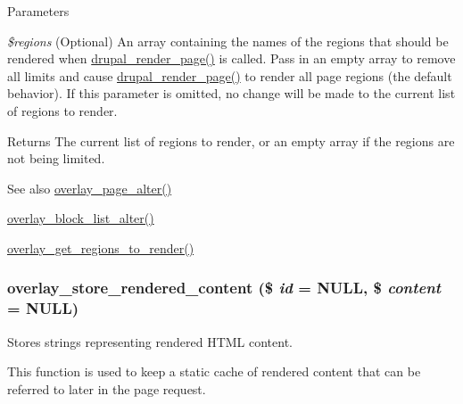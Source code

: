 \begin{DoxyParams}{Parameters}
\item[{\em \$regions}](Optional) An array containing the names of the regions that should be rendered when \hyperlink{common_8inc_ad85d021b660f070849ed7c215d9758fe}{drupal\_\-render\_\-page()} is called. Pass in an empty array to remove all limits and cause \hyperlink{common_8inc_ad85d021b660f070849ed7c215d9758fe}{drupal\_\-render\_\-page()} to render all page regions (the default behavior). If this parameter is omitted, no change will be made to the current list of regions to render.\end{DoxyParams}
\begin{DoxyReturn}{Returns}
The current list of regions to render, or an empty array if the regions are not being limited.
\end{DoxyReturn}
\begin{DoxySeeAlso}{See also}
\hyperlink{overlay_8module_a6562f3cdc2016db35295e1c97a2de3f2}{overlay\_\-page\_\-alter()} 

\hyperlink{overlay_8module_a507bf99a50710b798ef39ff0e74b41a8}{overlay\_\-block\_\-list\_\-alter()} 

\hyperlink{overlay_8module_a1881ec6bb74538db7efd8bbd374d00e7}{overlay\_\-get\_\-regions\_\-to\_\-render()} 
\end{DoxySeeAlso}
\hypertarget{overlay_8module_a83ad6249c4b5cf10dfc5a810dec1a800}{
\subsubsection[{overlay\_\-store\_\-rendered\_\-content}]{\setlength{\rightskip}{0pt plus 5cm}overlay\_\-store\_\-rendered\_\-content (\$ {\em id} = {\ttfamily NULL}, \/  \$ {\em content} = {\ttfamily NULL})}}
\label{overlay_8module_a83ad6249c4b5cf10dfc5a810dec1a800}
Stores strings representing rendered HTML content.

This function is used to keep a static cache of rendered content that can be referred to later in the page request.


